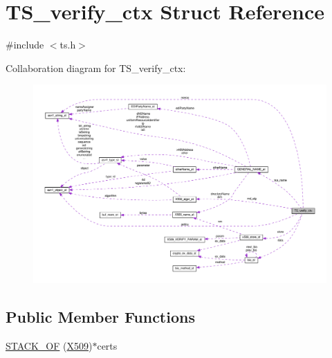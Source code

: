 \hypertarget{struct_t_s__verify__ctx}{}\section{T\+S\+\_\+verify\+\_\+ctx Struct Reference}
\label{struct_t_s__verify__ctx}


{\ttfamily \#include $<$ts.\+h$>$}



Collaboration diagram for T\+S\+\_\+verify\+\_\+ctx\+:
\nopagebreak
\begin{figure}[H]
\begin{center}
\leavevmode
\includegraphics[width=350pt]{struct_t_s__verify__ctx__coll__graph}
\end{center}
\end{figure}
\subsection*{Public Member Functions}
\begin{DoxyCompactItemize}
\item 
\hyperlink{struct_t_s__verify__ctx_a36e6c2b04d76cae5b17aa2d45a371157}{S\+T\+A\+C\+K\+\_\+\+OF} (\hyperlink{ossl__typ_8h_a4f666bde6518f95deb3050c54b408416}{X509})$\ast$certs
\end{DoxyCompactItemize}
